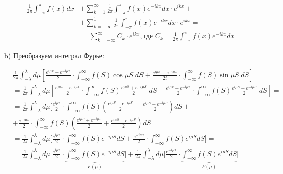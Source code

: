 \begin{align*}
    \frac{1}{2\pi} \int_{-\pi}^\pi f(x) dx &+
    \sum_{k = 1}^\infty \frac{1}{2\pi}
    \int_{-\pi}^\pi f(x) e^{-ikx} dx \cdot e^{ikx} + \\ 
    &+ \sum_{k = -\infty}^1 \frac{1}{2\pi}
    \int_{-\pi}^\pi f(x) e^{-ikx} dx \cdot e^{ikx} = \\
    &= \sum_{k = -\infty}^\infty C_k \cdot e^{ikx},
    \text{где  } C_k = \frac{1}{2\pi} \int_{-\pi}^\pi f(x) e^{-ikx} dx
\end{align*}


b) Преобразуем интеграл Фурье:

\begin{align*}
    &\frac{1}{2\pi} \int_{-\lambda}^\lambda d\mu \left[
        \frac{e^{i\mu x} + e^{-i\mu x}}{2} \cdot
        \int_{-\infty}^\infty f(S) \cos \mu S \; dS +
        \frac{e^{i\mu x} - e^{-i\mu x}}{2i} \cdot
        \int_{-\infty}^\infty f(S) \sin \mu S \; dS
    \right] = \\
    &= \frac{1}{2\pi} \int_{-\lambda}^\lambda d\mu \left[
        \frac{e^{i\mu x} + e^{-i\mu x}}{2} \cdot
        \int_{-\infty}^\infty f(S) \frac{e^{i\mu S} + e^{-i\mu S}}{2} \; dS -
        \frac{e^{i\mu x} - e^{-i\mu x}}{2} \cdot
        \int_{-\infty}^\infty f(S) \frac{e^{i\mu S} - e^{-i\mu S}}{2} \; dS
    \right] = \\
    &= \frac{1}{2\pi} \int_{-\lambda}^\lambda d\mu \Bigg[
        \frac{e^{i\mu x}}{2} \cdot
        \int_{-\infty}^\infty f(S) \left(
            \frac{e^{i\mu S} + e^{-i \mu S}}{2} -
            \frac{e^{i\mu S} - e^{-i \mu S}}{2}
        \right) dS + \\ &+
        \frac{e^{-i\mu x}}{2} \cdot
        \int_{-\infty}^\infty f(S) \left(
            \frac{e^{i\mu S} + e^{-i \mu S}}{2} +
            \frac{e^{i\mu S} - e^{-i \mu S}}{2}
        \right) dS
    \Bigg] = \\
    &= \frac{1}{2\pi} \int_{-\lambda}^\lambda d\mu \Bigg[
        \frac{e^{i\mu x}}{2} \cdot
        \int_{-\infty}^\infty f(S) e^{-i\mu S} dS +
        \frac{e^{-i\mu x}}{2} \cdot
        \int_{-\infty}^\infty f(S) e^{i\mu S} dS
    \Bigg] = \\
    &= 
    \frac{1}{2\pi} \int_{-\lambda}^\lambda d\mu \Bigg[
    \frac{e^{i\mu x}}{2} \cdot
    \underbrace{\int_{-\infty}^\infty f(S) e^{-i\mu S} dS}_{F(\mu)} \Bigg] +
    \frac{1}{2\pi} \int_{-\lambda}^\lambda d\mu \Bigg[
    \frac{e^{-i\mu x}}{2} \cdot
    \underbrace{\int_{-\infty}^\infty f(S) e^{i\mu S} dS}_{F(\mu)} \Bigg]
\end{align*}

